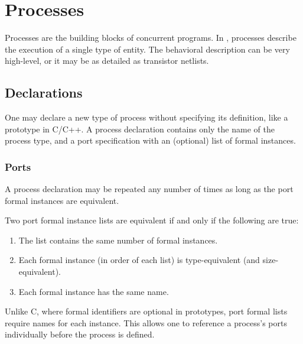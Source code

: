 

\chapter{Processes}
\label{sec:processes}

Processes are the building blocks of concurrent programs.  
In \hac, processes describe the execution of a single type of entity.  
The behavioral description can be very high-level, 
or it may be as detailed as transistor netlists.  

\section{Declarations}
\label{sec:process:declarations}

One may declare a new type of process without specifying its definition, 
like a prototype in C/C++.  
A process declaration contains only the name of the process type, 
and a port specification with an (optional) list of formal instances.  

\subsection{Ports}
\label{sec:processes:declarations:ports}


A process declaration may be repeated any number of times as long
as the port formal instances are equivalent.  

Two port formal instance lists are equivalent
if and only if the following are true:
\begin{enumerate}
\item The list contains the same number of formal instances.  
\item Each formal instance (in order of each list) is type-equivalent
	(and size-equivalent).
\item Each formal instance has the same name.  
\end{enumerate}

Unlike C, where formal identifiers are optional in prototypes, 
port formal lists require names for each instance.  
This allows one to reference a process's ports individually 
before the process is defined.  

